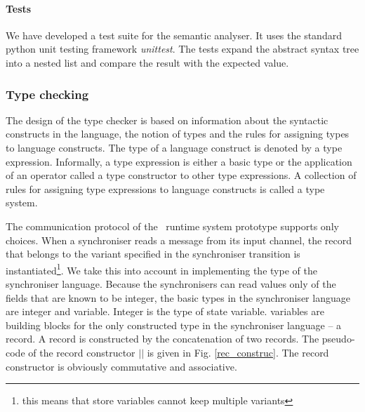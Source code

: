 

    \paragraph{Tests}
We have developed a test suite for the semantic analyser. It uses the standard python unit testing framework \emph{unittest}. The tests expand the abstract syntax tree into a nested list and compare the result with the expected value.


  \subsubsection*{Type checking}\label{type_check}
The design of the type checker is based on information about the syntactic constructs in the language, the notion of types and the rules for assigning types to language constructs. The type of a language construct is denoted by a type expression. Informally, a type expression is either a basic type or the application of an operator called a type constructor to other type expressions. A collection of rules for assigning type expressions to language constructs is called a type system.

The communication protocol of the \ak\ runtime system prototype supports only choices. When a synchroniser reads a message from its input channel, the record that belongs to the variant specified in the synchroniser transition is instantiated\footnote{this means that store variables cannot keep multiple variants}. We take this into account in implementing the type  of the synchroniser language. Because the synchronisers can read values only of the fields that are known to be integer, the basic types in the synchroniser language are integer and  variable. Integer is the type of state variable.  variables are building blocks for the only constructed type in the synchroniser language -- a record. A record is constructed by the concatenation of two records. The pseudo-code of the record constructor $||$ is given in Fig. \ref{rec_construc}. The record constructor is obviously commutative and associative.

